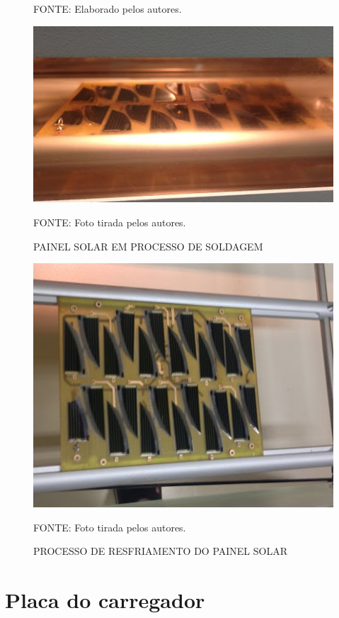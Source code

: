 \documentclass[
	12pt,				%
	openright,			%
	oneside,			%
	a4paper,			%
	english,			%
	french,				%
	spanish,			%
	brazil,				%
	oldfontcommands
	]{abntex2}
\begin{document}
\begin{apendicesenv}
\begin{figure}[th]
		\begin{small}
			FONTE: Elaborado pelos autores.
		\end{small}		
	\end{figure}
	
	\begin{figure}[th]
		\caption{PAINEL SOLAR EM PROCESSO DE SOLDAGEM}
		\centering
		\includegraphics[width=0.75\linewidth]{./anexos/proto3}
		
		\begin{small}
			FONTE: Foto tirada pelos autores.
		\end{small}	
	\end{figure}
	
	\begin{figure}[th]
		\caption{PROCESSO DE RESFRIAMENTO DO PAINEL SOLAR}
		\centering
		\includegraphics[width=0.75\linewidth]{./anexos/proto4}
		
		\begin{small}
			FONTE: Foto tirada pelos autores.
		\end{small}	
	\end{figure}
	

\chapter[Placa do carregador]{Placa do carregador}\label{P_Carreg}


\end{apendicesenv}
\end{document}

